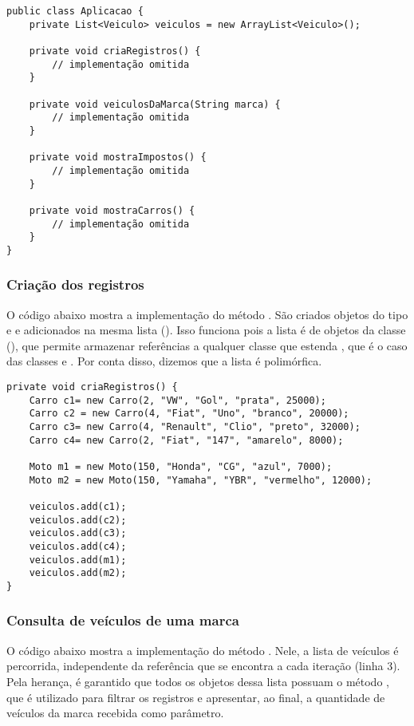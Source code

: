 \begin{verbatim}
public class Aplicacao {
	private List<Veiculo> veiculos = new ArrayList<Veiculo>();
	
	private void criaRegistros() {
		// implementação omitida
	}
	
	private void veiculosDaMarca(String marca) {
		// implementação omitida
	}
	
	private void mostraImpostos() {
		// implementação omitida
	}
	
	private void mostraCarros() {
		// implementação omitida
	}
}
\end{verbatim}

\subsubsection{Criação dos registros}

O código abaixo mostra a implementação do método . São criados objetos do tipo  e  e adicionados na mesma lista (). Isso funciona pois a lista é de objetos da classe  (), que permite armazenar referências a qualquer classe que estenda , que é o caso das classes  e . Por conta disso, dizemos que a lista é polimórfica.

\begin{verbatim}
private void criaRegistros() {
	Carro c1= new Carro(2, "VW", "Gol", "prata", 25000);
	Carro c2 = new Carro(4, "Fiat", "Uno", "branco", 20000);
	Carro c3= new Carro(4, "Renault", "Clio", "preto", 32000);
	Carro c4= new Carro(2, "Fiat", "147", "amarelo", 8000);

	Moto m1 = new Moto(150, "Honda", "CG", "azul", 7000);
	Moto m2 = new Moto(150, "Yamaha", "YBR", "vermelho", 12000);

	veiculos.add(c1);
	veiculos.add(c2);
	veiculos.add(c3);
	veiculos.add(c4);
	veiculos.add(m1);
	veiculos.add(m2);
}
\end{verbatim}

\subsubsection{Consulta de veículos de uma marca}

O código abaixo mostra a implementação do método . Nele, a lista de veículos é percorrida, independente da referência que se encontra a cada iteração (linha 3). Pela herança, é garantido que todos os objetos dessa lista possuam o método , que é utilizado para filtrar os registros e apresentar, ao final, a quantidade de veículos da marca recebida como parâmetro.

